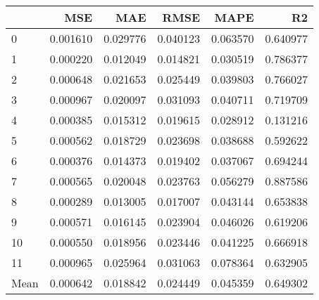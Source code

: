 \begin{tabular}{lrrrrr}
\toprule
 & MSE & MAE & RMSE & MAPE & R2 \\
\midrule
0 & 0.001610 & 0.029776 & 0.040123 & 0.063570 & 0.640977 \\
1 & 0.000220 & 0.012049 & 0.014821 & 0.030519 & 0.786377 \\
2 & 0.000648 & 0.021653 & 0.025449 & 0.039803 & 0.766027 \\
3 & 0.000967 & 0.020097 & 0.031093 & 0.040711 & 0.719709 \\
4 & 0.000385 & 0.015312 & 0.019615 & 0.028912 & 0.131216 \\
5 & 0.000562 & 0.018729 & 0.023698 & 0.038688 & 0.592622 \\
6 & 0.000376 & 0.014373 & 0.019402 & 0.037067 & 0.694244 \\
7 & 0.000565 & 0.020048 & 0.023763 & 0.056279 & 0.887586 \\
8 & 0.000289 & 0.013005 & 0.017007 & 0.043144 & 0.653838 \\
9 & 0.000571 & 0.016145 & 0.023904 & 0.046026 & 0.619206 \\
10 & 0.000550 & 0.018956 & 0.023446 & 0.041225 & 0.666918 \\
11 & 0.000965 & 0.025964 & 0.031063 & 0.078364 & 0.632905 \\
Mean & 0.000642 & 0.018842 & 0.024449 & 0.045359 & 0.649302 \\
\bottomrule
\end{tabular}
